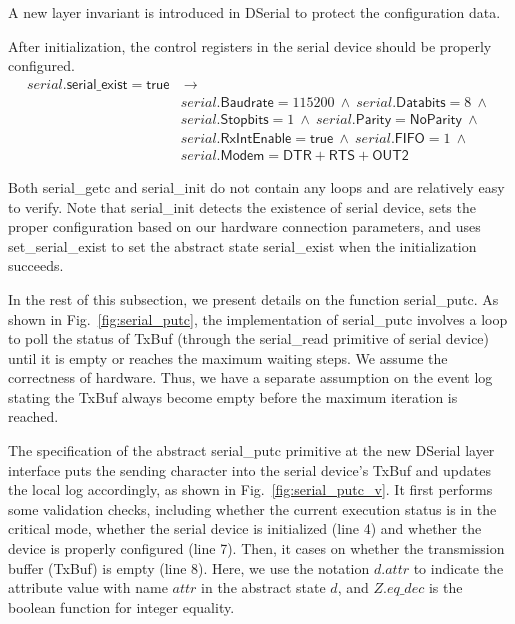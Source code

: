 A new layer invariant is introduced in DSerial to protect the configuration data.

\begin{invariant}
	After initialization, the control registers in the serial device should
be properly configured.
\[
\begin{array}{ll}
	serial.\textsf{serial\_exist} = \textsf{true}  & ~\rightarrow \\
	& serial.\textsf{Baudrate} = 115200 ~\wedge~
	  serial.\textsf{Databits} = 8 ~\wedge~ \\
	& serial.\textsf{Stopbits} = 1 ~\wedge~ 
	  serial.\textsf{Parity} = \textsf{NoParity} ~\wedge~ \\
	& serial.\textsf{RxIntEnable} = \textsf{true} ~\wedge~ 
	  serial.\textsf{FIFO} = 1 ~\wedge~ \\
	&  serial.\textsf{Modem} = \textsf{DTR} + \textsf{RTS} + \textsf{OUT2}
\end{array}
\]

\end{invariant}

Both \textsf{serial\_getc} and \textsf{serial\_init} do not contain any loops
and are relatively easy to verify. Note that \textsf{serial\_init} detects the
existence of serial device, sets the proper configuration based on our hardware
connection parameters, and uses \textsf{set\_serial\_exist} to set the abstract
state \textsf{serial\_exist} when the initialization succeeds.

In the rest of this subsection, we present details on the function
\textsf{serial\_putc}. As shown in Fig.~\ref{fig:serial_putc}, the
implementation of \textsf{serial\_putc} involves a loop to poll the status of
TxBuf (through the \textsf{serial\_read} primitive of serial device) until it is
empty or reaches the maximum waiting steps. We assume the correctness of
hardware. Thus, we have a separate assumption on the event log stating the TxBuf
always become empty before the maximum iteration is reached.

The specification of the abstract \textsf{serial\_putc} primitive at the new
DSerial layer interface puts the sending character into the serial device's
TxBuf and updates the local log accordingly, as shown in
Fig.~\ref{fig:serial_putc_v}. It first performs some validation checks, including
whether the current execution status is in the critical mode, whether the serial
device is initialized (line 4) and whether the device is properly configured
(line 7). Then, it cases on whether the transmission buffer (TxBuf) is empty
(line 8). Here, we use the notation $d.attr$ to indicate the attribute
value with name $attr$ in the abstract state $d$, and $Z.eq\_dec$ is the
boolean function for integer equality.

